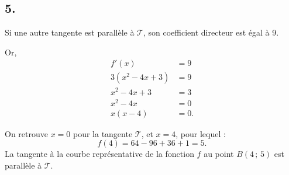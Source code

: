 \documentclass[10pt]{article}
\begin{document}
\subsection*{5.}

Si une autre tangente est parallèle à \(\mathcal{T}\), son coefficient directeur est égal à 9.

Or,
\begin{align*}
f'(x) &= 9 \\
3(x^2 - 4x + 3) &= 9 \\
x^2 - 4x + 3 &= 3 \\
x^2 - 4x &= 0 \\
x(x - 4) &= 0.
\end{align*}

On retrouve \(x = 0\) pour la tangente \(\mathcal{T}\), et \(x = 4\), pour lequel :
\[
f(4) = 64 - 96 + 36 + 1 = 5.
\]  
La tangente à la courbe représentative de la fonction \(f\) au point \(B(4\,;\,5)\) est parallèle à \(\mathcal{T}\).
\end{document}

